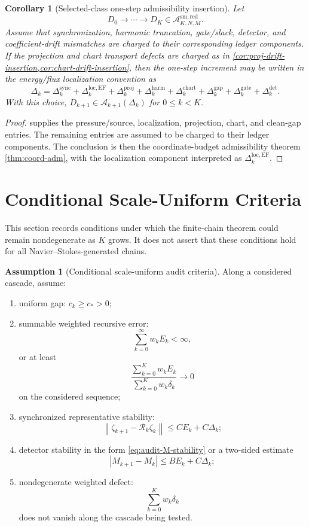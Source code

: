 \documentclass[11pt]{article}
\numberwithin{equation}{section}
\theoremstyle{plain}
\newtheorem{corollary}[theorem]{Corollary}
\theoremstyle{definition}
\newtheorem{assumption}[theorem]{Assumption}
\theoremstyle{remark}
\newcommand{\harm}{\mathrm{harm}}
\newcommand{\proj}{\mathrm{proj}}
\newcommand{\sync}{\mathrm{sync}}
\newcommand{\gate}{\mathrm{gate}}
\newcommand{\detc}{\mathrm{det}}
\newcommand{\locerr}{\mathrm{loc}}
\newcommand{\gap}{\mathrm{gap}}
\newcommand{\A}{\mathcal A}
\newcommand{\norm}[1]{\left\lVert #1\right\rVert}
\newcommand{\abs}[1]{\left\lvert #1\right\rvert}
\begin{document}
\begin{corollary}[Selected-class one-step admissibility insertion]\label{cor:smred-one-step-insertion}
Let
\[
  D_0\to\cdots\to D_K\in\A_{K,N,M}^{\mathrm{sm,red}}.
\]
Assume that synchronization, harmonic truncation, gate/slack, detector, and
coefficient-drift mismatches are charged to their corresponding ledger
components.  If the projection and chart transport defects are charged as in
\cref{cor:proj-drift-insertion,cor:chart-drift-insertion}, then the one-step
increment may be written in the energy/flux localization convention as
\[
  \Delta_k
  =
  \Delta_k^{\sync}
  +
  \Delta_k^{\locerr,\mathrm{EF}}
  +
  \Delta_k^{\proj}
  +
  \Delta_k^{\harm}
  +
  \Delta_k^{\mathrm{chart}}
  +
  \Delta_k^{\gap}
  +
  \Delta_k^{\gate}
  +
  \Delta_k^{\detc}.
\]
With this choice, \(D_{k+1}\in\mathcal A_{k+1}(\Delta_k)\) for
\(0\le k<K\).
\end{corollary}

\begin{proof}
 supplies the pressure/source,
localization, projection, chart, and clean-gap entries.  The remaining
entries are assumed to be charged to their ledger components.  The conclusion
is then the coordinate-budget admissibility theorem
\cref{thm:coord-adm}, with the localization component interpreted as
\(\Delta_k^{\locerr,\mathrm{EF}}\).
\end{proof}


\section{Conditional Scale-Uniform Criteria}

This section records conditions under which the finite-chain theorem could
remain nondegenerate as \(K\) grows.  It does not assert that these
conditions hold for all Navier--Stokes-generated chains.

\begin{assumption}[Conditional scale-uniform audit criteria]\label{ass:scale-uniform}
Along a considered cascade, assume:
\begin{enumerate}[label=(\alph*)]
  \item uniform gap: \(c_k\ge c_*>0\);
  \item summable weighted recursive error:
  \[
    \sum_{k=0}^\infty w_kE_k<\infty,
  \]
  or at least
  \[
    \frac{\sum_{k=0}^K w_kE_k}{\sum_{k=0}^K w_k\delta_k}\to0
  \]
  on the considered sequence;
  \item synchronized representative stability:
  \[
    \norm{\zeta_{k+1}-\mathcal R_k\zeta_k}
    \le C E_k+C\Delta_k;
  \]
  \item detector stability in the form \eqref{eq:audit-M-stability} or a two-sided
  estimate
  \[
    \abs{M_{k+1}-M_k}\le B E_k+C\Delta_k;
  \]
  \item nondegenerate weighted defect:
  \[
    \sum_{k=0}^K w_k\delta_k
  \]
  does not vanish along the cascade being tested.
\end{enumerate}
\end{assumption}
\end{document}
